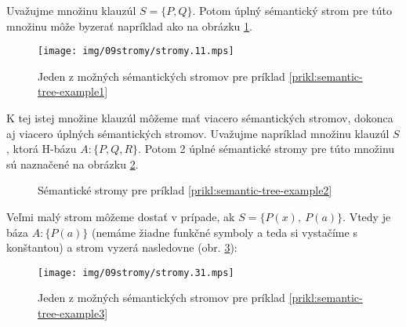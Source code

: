 \begin{priklad}
    \label{prikl:semantic-tree-example1}
    Uvažujme množinu klauzúl $S = \{P,Q\}$. Potom úplný sémantický strom
    pre túto množinu môže byzerať napríklad ako na obrázku
    \ref{fig:semantic-tree-example1}.

    \begin{figure}[h]
        \centering
        \texttt{[image: img/09stromy/stromy.11.mps]}
        \caption{Jeden z možných sémantických stromov pre príklad
                \ref{prikl:semantic-tree-example1}}
        \label{fig:semantic-tree-example1}
    \end{figure}
\end{priklad}

\begin{priklad}
    \label{prikl:semantic-tree-example2}
    K tej istej množine klauzúl môžeme mať viacero sémantických stromov,
    dokonca aj viacero úplných sémantických stromov.
    Uvažujme napríklad množinu klauzúl $S$, ktorá H-bázu $A: \{ P, Q, R \}$.
    Potom 2 úplné sémantické stromy pre túto množinu sú naznačené na
    obrázku
    \ref{fig:semantic-tree-example2}.

    \begin{figure}[h]
        \centering
        \caption{Sémantické stromy pre príklad
                \ref{prikl:semantic-tree-example2}}
        \label{fig:semantic-tree-example2}
    \end{figure}
\end{priklad}


\begin{priklad}
    \label{prikl:semantic-tree-example3}
    Veľmi malý strom môžeme dostať v prípade, ak $S=\{P(x),\ P(a)\}$. Vtedy
    je báza $A:\{P(a)\}$ (nemáme žiadne funkčné symboly a teda si vystačíme
    s konštantou) a strom vyzerá nasledovne (obr.
    \ref{fig:semantic-tree-example3}):

    \begin{figure}[h]
        \centering
        \texttt{[image: img/09stromy/stromy.31.mps]}
        \caption{Jeden z možných sémantických stromov pre príklad
                \ref{prikl:semantic-tree-example3}}
        \label{fig:semantic-tree-example3}
    \end{figure}
\end{priklad}

